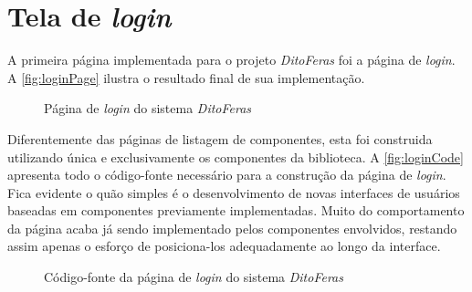 \section{Tela de \textit{login}}
\label{sec:telaLogin}

A primeira página implementada para o projeto \textit{DitoFeras} foi a página de \textit{login}. A \autoref{fig:loginPage} ilustra o resultado final de sua implementação.

\begin{figure}
  \begin{center}
	\end{center}
  \caption{Página de \textit{login} do sistema \textit{DitoFeras}}
  \label{fig:loginPage}
\end{figure}

Diferentemente das páginas de listagem de componentes, esta foi construida utilizando única e exclusivamente os componentes da biblioteca. A \autoref{fig:loginCode} apresenta todo o código-fonte necessário para a construção da página de \textit{login}. Fica evidente o quão simples é o desenvolvimento de novas interfaces de usuários baseadas em componentes previamente implementadas. Muito do comportamento da página acaba já sendo implementado pelos componentes envolvidos, restando assim apenas o esforço de posiciona-los adequadamente ao longo da interface.

\begin{figure}
  \begin{center}
	\end{center}
  \caption{Código-fonte da página de \textit{login} do sistema \textit{DitoFeras}}
  \label{fig:loginCode}
\end{figure}

